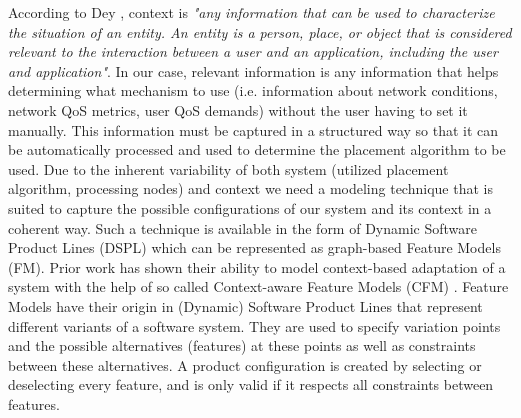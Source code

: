 According to Dey \cite{Dey2001}, context is \textit{"any information that can be used to characterize the situation of an entity. An entity is a person, place, or object that is considered relevant to the interaction between a user and an application, including the user and application"}.
In our case, relevant information is any information that helps determining what mechanism to use (i.e. information about network conditions, network QoS metrics, user QoS demands) without the user having to set it manually.
This information must be captured in a structured way so that it can be automatically processed and used to determine the placement algorithm to be used.  
Due to the inherent variability of both system (utilized placement algorithm, processing nodes) and context we need a modeling technique that is suited to capture the possible configurations of our system and its context in a coherent way. 
Such a technique is available in the form of Dynamic Software Product Lines (DSPL) which can be represented as graph-based Feature Models (FM). Prior work has shown their ability to model context-based adaptation of a system with the help of so called Context-aware Feature Models (CFM) \cite{Saller2013} \cite{Acher2009}.
Feature Models have their origin in (Dynamic) Software Product Lines that represent different variants of a software system. They are used to specify variation points and the possible alternatives (features) at these points as well as constraints between these alternatives. A product configuration is created by 
 selecting or deselecting every feature, and is only valid if it respects all constraints between features.
 
